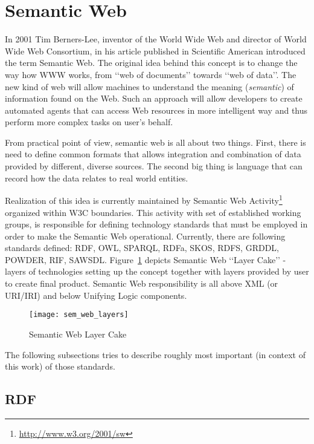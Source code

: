 
\section{Semantic Web}
\label{sec:ch2_semantic_web}

In 2001 Tim Berners-Lee, inventor of the World Wide Web and director of World Wide Web Consortium, in his article published in Scientific American\cite{berneslee:semanticWeb} introduced the term Semantic Web. The original idea behind this concept is to change the way how WWW works, from \lq\lq{}web of documents\rq\rq{} towards \lq\lq{}web of data\rq\rq{}. The new kind of web will allow machines to understand the meaning (\emph{semantic}) of information found on the Web. Such an approach will allow developers to create automated agents that can access Web resources in more intelligent way and thus perform more complex tasks on user\rq{}s behalf.

From practical point of view, semantic web is all about two things. First, there is need to define common formats that allows integration and combination of data provided by different, diverse sources. The second big thing is language that can record how the data relates to real world entities. 

Realization of this idea is currently maintained by Semantic Web Activity\footnote{\url{http://www.w3.org/2001/sw}} organized within W3C boundaries. This activity with set of established working groups, is responsible for defining technology standards that must be employed in order to make the Semantic Web operational. Currently, there are following standards defined: RDF, OWL, SPARQL, RDFa, SKOS, RDFS, GRDDL, POWDER, RIF, SAWSDL. Figure~\ref{fig:sem_web_layers} depicts Semantic Web \lq\lq{}Layer Cake\rq\rq{} - layers of technologies setting up the concept together with layers provided by user to create final product. Semantic Web responsibility is all above XML (or URI/IRI) and below Unifying Logic components.

\begin{figure}[ht]
  \centering
  \texttt{[image: sem\_web\_layers]}
  \caption{Semantic Web Layer Cake}
  \label{fig:sem_web_layers}
\end{figure}

The following subsections tries to describe roughly most important (in context of this work) of those standards.

\subsection{RDF}

